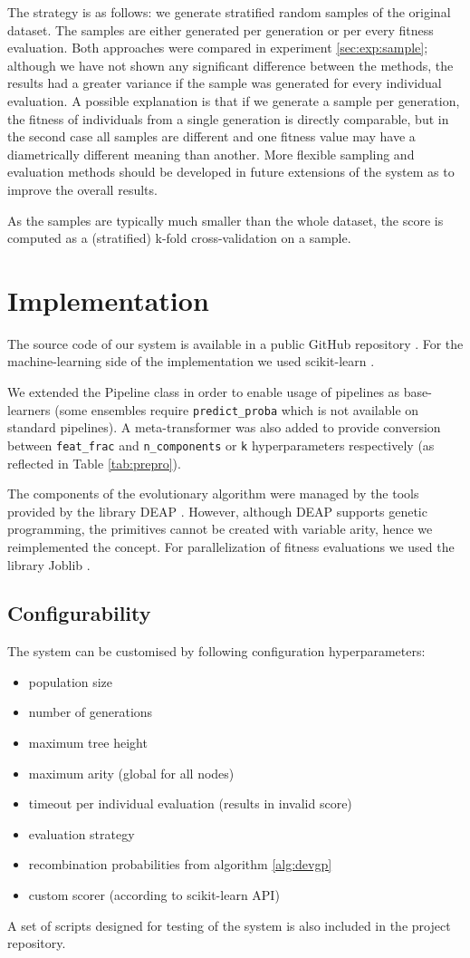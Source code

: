 The strategy is as follows: we generate stratified random samples of the
original dataset. The samples are either generated per generation or per
every fitness evaluation. Both approaches were compared in experiment
\ref{sec:exp:sample}; although we have not shown any significant difference between
the methods, the results had a greater variance if the sample was generated for
every individual evaluation. A possible explanation is that if we generate a sample
per generation, the fitness of individuals from a single generation is directly
comparable, but in the second case all samples are different and one fitness value
may have a diametrically different meaning than another. More flexible sampling and
evaluation methods should be developed in future extensions of the system as to
improve the overall results.

As the samples are typically much smaller than the whole dataset, the score
is computed as a (stratified) k-fold cross-validation on a sample.
\section{Implementation} \label{genens:impl}
The source code of our system is available in a public GitHub repository
\citep{git_genens}.
For the machine-learning side of the implementation we used scikit-learn
\citep{scikit-learn}.

We extended the Pipeline class in order to enable usage
of pipelines as base-learners (some ensembles require \texttt{predict\_proba}
which is not available on standard pipelines). A meta-transformer was also
added to provide conversion between \texttt{feat\_frac} and 
\texttt{n\_components} or \texttt{k} hyperparameters respectively (as reflected
in Table \ref{tab:prepro}).

The components of the evolutionary algorithm were managed by the tools provided by
the library DEAP \citep{DEAP_JMLR2012}. However, although DEAP supports genetic
programming, the primitives cannot be created with variable arity, hence we
reimplemented the concept.
For parallelization of fitness evaluations we used the library Joblib
\citep{joblib}.

\subsection{Configurability}
The system can be customised by following configuration hyperparameters:

\begin{itemize}
\item population size
\item number of generations
\item maximum tree height
\item maximum arity (global for all nodes)
\item timeout per individual evaluation (results in invalid score)
\item evaluation strategy
\item recombination probabilities from algorithm \ref{alg:devgp}
\item custom scorer (according to scikit-learn API)
\end{itemize}

A set of scripts designed for testing of the system is also included in the project
repository.